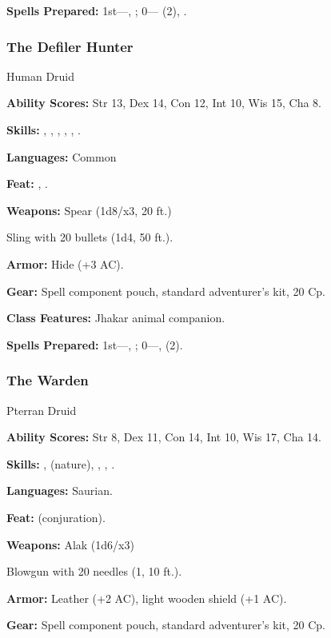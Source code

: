 \textbf{Spells Prepared:} 1st---, ; 0--- (2), .

\subsubsection{The Defiler Hunter}

Human Druid

\textbf{Ability Scores:} Str 13, Dex 14, Con 12, Int 10, Wis 15, Cha 8.

\textbf{Skills:} , , , , , .

\textbf{Languages:} Common

\textbf{Feat:} , .

\textbf{Weapons:} Spear (1d8/x3, 20 ft.)

Sling with 20 bullets (1d4, 50 ft.).

\textbf{Armor:} Hide (+3 AC).

\textbf{Gear:} Spell component pouch, standard adventurer's kit, 20 Cp.

\textbf{Class Features:} Jhakar animal companion.

\textbf{Spells Prepared:} 1st---, ;\hskip10pt 0---,  (2).

\subsubsection{The Warden}

Pterran Druid

\textbf{Ability Scores:} Str 8, Dex 11, Con 14, Int 10, Wis 17, Cha 14.

\textbf{Skills:} ,  (nature), , , .

\textbf{Languages:} Saurian.

\textbf{Feat:}  (conjuration).

\textbf{Weapons:} Alak (1d6/x3)

Blowgun with 20 needles (1, 10 ft.).

\textbf{Armor:} Leather (+2 AC), light wooden shield (+1 AC).

\textbf{Gear:} Spell component pouch, standard adventurer's kit, 20 Cp.

